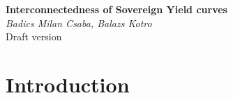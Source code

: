 \documentclass{article}
\begin{document}
\begin{titlepage}
   \begin{center}
      \Large\textbf{Interconnectedness of Sovereign Yield curves}\\
       \medskip
      \large\textit{Badics Milan Csaba, Balazs Kotro}\\
      \medskip
      \large{Draft version}
   \end{center}
\end{titlepage}




\begin{abstract}\rm
\begin{adjustwidth}{0.1cm}{0.1cm}{\itshape\textbf{Abstract:}} 
This paper is examining the linkages between the whole tenor structure of the yield curves of 12 sovereigns from all over the globe. The curves got decomposed to level, slope and curvature factors by the Nelson Siegel model. TBC…
\end{adjustwidth}
\end{abstract}

\section{Introduction}
\end{document}
